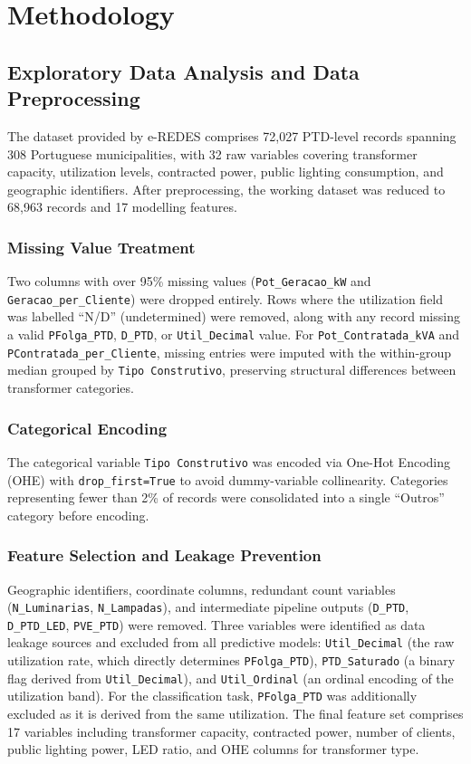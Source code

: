 \documentclass[conference]{IEEEtran}
\begin{document}
\section{Methodology}

\subsection{Exploratory Data Analysis and Data Preprocessing}

The dataset provided by e-REDES comprises 72,027 PTD-level records spanning 308 Portuguese municipalities, with 32 raw variables covering transformer capacity, utilization levels, contracted power, public lighting consumption, and geographic identifiers. After preprocessing, the working dataset was reduced to 68,963 records and 17 modelling features.

\subsubsection{Missing Value Treatment}
Two columns with over 95\% missing values (\texttt{Pot\_Geracao\_kW} and \texttt{Geracao\_per\_Cliente}) were dropped entirely. Rows where the utilization field was labelled ``N/D'' (undetermined) were removed, along with any record missing a valid \texttt{PFolga\_PTD}, \texttt{D\_PTD}, or \texttt{Util\_Decimal} value. For \texttt{Pot\_Contratada\_kVA} and \texttt{PContratada\_per\_Cliente}, missing entries were imputed with the within-group median grouped by \texttt{Tipo Construtivo}, preserving structural differences between transformer categories.

\subsubsection{Categorical Encoding}
The categorical variable \texttt{Tipo Construtivo} was encoded via One-Hot Encoding (OHE) with \texttt{drop\_first=True} to avoid dummy-variable collinearity. Categories representing fewer than 2\% of records were consolidated into a single ``Outros'' category before encoding.

\subsubsection{Feature Selection and Leakage Prevention}
Geographic identifiers, coordinate columns, redundant count variables (\texttt{N\_Luminarias}, \texttt{N\_Lampadas}), and intermediate pipeline outputs (\texttt{D\_PTD}, \texttt{D\_PTD\_LED}, \texttt{PVE\_PTD}) were removed. Three variables were identified as data leakage sources and excluded from all predictive models: \texttt{Util\_Decimal} (the raw utilization rate, which directly determines \texttt{PFolga\_PTD}), \texttt{PTD\_Saturado} (a binary flag derived from \texttt{Util\_Decimal}), and \texttt{Util\_Ordinal} (an ordinal encoding of the utilization band). For the classification task, \texttt{PFolga\_PTD} was additionally excluded as it is derived from the same utilization. The final feature set comprises 17 variables including transformer capacity, contracted power, number of clients, public lighting power, LED ratio, and OHE columns for transformer type.
\end{document}
